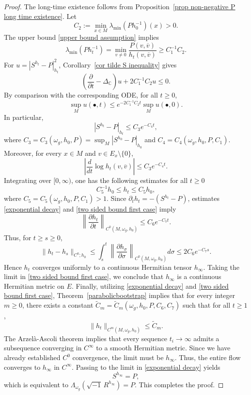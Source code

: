 \documentclass[12pt, reqno]{amsart}
\theoremstyle{plain}
\theoremstyle{definition}
\newcommand{\bproof}{\begin{proof}}
\newcommand{\eproof}{\end{proof}}
\newcommand{\p}{\partial}
\renewcommand{\bar}{\overline}
\newcommand{\beq}{\begin{equation}}
\newcommand{\eeq}{\end{equation}}
\renewcommand{\tilde}{\widetilde}
\renewcommand{\>}{\rightarrow}
\newcommand{\C}{{\mathbb C}}
\renewcommand{\>}{\rightarrow}
\renewcommand{\p}{{\partial}}
\newcommand{\om}{\omega}
\renewcommand{\bar}{\overline}
\renewcommand{\tilde}{\widetilde}
\numberwithin{equation}{section} %
\begin{document}
\bproof
The long-time existence follows from Proposition~\ref{prop non-negative P long time existence}. Let
\beq
C_2:=\min_{x\in M}\lambda_{\min}(Ph_0^{-1})(x)>0.
\eeq
The upper bound \eqref{upper bound assumption} implies
\beq
\lambda_{\min}(Ph_t^{-1})
=\min_{v\ne0}\frac{P(v,\bar v)}{h_t(v,\bar v)}
\geq C_1^{-1}C_2.
\eeq
For $u=|S^{h_t}-P|_{h_t}^2$, Corollary~\ref{cor tilde S inequality} gives
\beq
\left(\frac{\p }{\p t}-\Delta_\C \right)u + 2 C_1^{-1}C_2 u  \leq 0.
\eeq
By comparison with the corresponding ODE, for all $t\geq 0$,
\beq
\sup_Mu(\bullet,t)\leq e^{-2C_1^{-1}C_2t}\sup_Mu(\bullet,0).
\eeq
In particular,
\beq
\left|S^{h_t}-P\right|_{h_t}\leq C_3e^{-C_4t},
\label{exponential decay}
\eeq
where $C_3=C_3(\om_g,h_0,P)=\sup_M\left|S^{h_0}-P\right|_{h_0}$ and $C_4=C_4(\om_g,h_0,P,C_1)$. Moreover,  for every $x\in M$ and $ v\in E_x\setminus\{0\}$,
\beq
\left|\frac{d}{dt}\log h_t(v,\bar v)\right|
\leq C_3e^{-C_4t}.
\eeq
Integrating over $[0,\infty)$, one has the following estimates for all $t\geq 0$
\beq
C_5^{-1}h_0\leq h_t\leq C_5h_0,
\label{two sided bound first case}
\eeq
where  $C_5=C_5(\om_g,h_0,P,C_1)>1$. Since $\partial_t h_t = -(S^{h_t} - P)$, estimates \eqref{exponential decay} and \eqref{two sided bound first case} imply
\begin{equation}
\left\| \frac{\partial h_t}{\partial t} \right\|_{C^0(M,\omega_g, h_0)} \leq C_6  e^{-C_7 t}.
\end{equation}
Thus, for $t \geq s \geq 0$,
\begin{equation}
\| h_t - h_s \|_{C^0; h_0} \leq \int_s^t \left\| \frac{\partial h_\sigma}{\partial \sigma} \right\|_{C^0(M,\omega_g, h_0)} d\sigma \leq 2 C_6  e^{-C_7 s}.
\end{equation}
Hence $h_t$ converges uniformly to a continuous Hermitian tensor $h_\infty$. Taking the limit in \eqref{two sided bound first case}, we conclude that $h_\infty$ is a continuous Hermitian metric on $E$.
Finally, utilizing \eqref{exponential decay} and \eqref{two sided bound first case}, Theorem~\ref{parabolicbootstrap} implies that for every integer $m \geq 0$, there exists a constant $\tilde{C}_m = \tilde{C}_m(\omega_g, h_0, P, C_6, C_{7})$ such that for all $t \geq 1$,
\begin{equation}
\| h_t \|_{C^m(M,\omega_g, h_0)} \leq \tilde{C}_m.
\end{equation}
The Arzel\`a-Ascoli theorem implies that every sequence $t_i \to \infty$ admits a subsequence converging in $C^\infty$ to a smooth Hermitian metric. Since we have already established $C^0$ convergence, the limit must be $h_\infty$. Thus, the entire flow converges to $h_\infty$ in $C^\infty$. Passing to the limit in \eqref{exponential decay} yields
\begin{equation}
S^{h_\infty} = P,
\end{equation}
which is equivalent to $\Lambda_{\omega_g}(\sqrt{-1}\, R^{h_\infty}) = P$. This completes the proof.
\eproof
\end{document}
